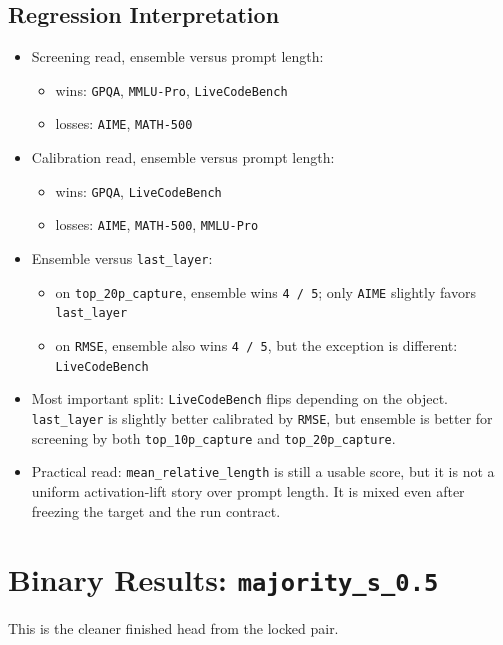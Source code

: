 \documentclass[11pt]{article}
\begin{document}
\subsection*{Regression Interpretation}
\begin{itemize}[leftmargin=1.5em]
\item Screening read, ensemble versus prompt length:
  \begin{itemize}[leftmargin=1.5em]
  \item wins: \texttt{GPQA}, \texttt{MMLU-Pro}, \texttt{LiveCodeBench}
  \item losses: \texttt{AIME}, \texttt{MATH-500}
  \end{itemize}
\item Calibration read, ensemble versus prompt length:
  \begin{itemize}[leftmargin=1.5em]
  \item wins: \texttt{GPQA}, \texttt{LiveCodeBench}
  \item losses: \texttt{AIME}, \texttt{MATH-500}, \texttt{MMLU-Pro}
  \end{itemize}
\item Ensemble versus \texttt{last\_layer}:
  \begin{itemize}[leftmargin=1.5em]
  \item on \texttt{top\_20p\_capture}, ensemble wins \texttt{4 / 5}; only \texttt{AIME} slightly favors \texttt{last\_layer}
  \item on \texttt{RMSE}, ensemble also wins \texttt{4 / 5}, but the exception is different: \texttt{LiveCodeBench}
  \end{itemize}
\item Most important split: \texttt{LiveCodeBench} flips depending on the object. \texttt{last\_layer} is slightly better calibrated by \texttt{RMSE}, but ensemble is better for screening by both \texttt{top\_10p\_capture} and \texttt{top\_20p\_capture}.
\item Practical read: \texttt{mean\_relative\_length} is still a usable score, but it is not a uniform activation-lift story over prompt length. It is mixed even after freezing the target and the run contract.
\end{itemize}

\section*{Binary Results: \texttt{majority\_s\_0.5}}
This is the cleaner finished head from the locked pair.
\end{document}
